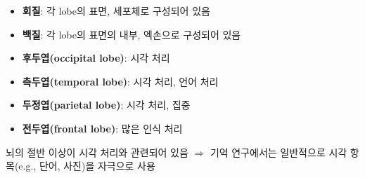 \documentclass[../note.tex]{subfiles}
\begin{document}
{
  \vspace{-2em}
  \begin{itemize}
    \item \textbf{회질}: 각 lobe의 표면, 세포체로 구성되어 있음
    \item \textbf{백질}: 각 lobe의 표면의 내부, 엑손으로 구성되어 있음
  \end{itemize}
}

{
  \vspace{-2em}
  \begin{itemize}
    \item \textbf{후두엽(occipital lobe)}: 시각 처리
    \item \textbf{측두엽(temporal lobe)}: 시각 처리, 언어 처리
    \item \textbf{두정엽(parietal lobe)}: 시각 처리, 집중
    \item \textbf{전두엽(frontal lobe)}: 많은 인식 처리
  \end{itemize}
  뇌의 절반 이상이 시각 처리와 관련되어 있음 $\Rightarrow$ 기억 연구에서는 일반적으로 시각 항목(e.g., 단어, 사진)을 자극으로 사용
}
\end{document}
